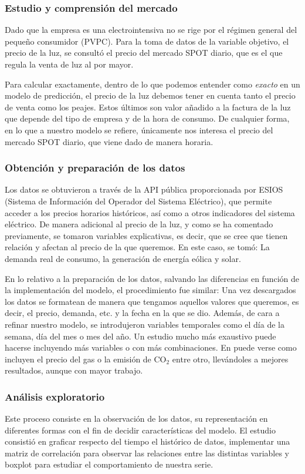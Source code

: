 \subsubsection{Estudio y comprensión del mercado}
%
%
%
Dado que la empresa es una electrointensiva no se rige por el régimen general del pequeño consumidor (PVPC). Para la toma de datos de la variable objetivo, el precio de la luz, se consultó el precio del mercado SPOT diario, que es el que regula la venta de luz al por mayor.

Para calcular exactamente, dentro de lo que podemos entender como \textit{exacto} en un modelo de predicción, el precio de la luz debemos tener en cuenta tanto el precio de venta como los peajes. Estos últimos son valor añadido a la factura de la luz que depende del tipo de empresa y de la hora de consumo. De cualquier forma, en lo que a nuestro modelo se refiere, únicamente nos interesa el precio del mercado SPOT diario, que viene dado de manera horaria.
%
%
%
\subsubsection{Obtención y preparación de los datos}
%
%
%
Los datos se obtuvieron a través de la API pública proporcionada por ESIOS (Sistema de Información del Operador del Sistema Eléctrico), que permite acceder a los precios horarios históricos, así como a otros indicadores del sistema eléctrico. De manera adicional al precio de la luz, y como se ha comentado previamente, se tomaron variables explicativas, es decir, que se cree que tienen relación y afectan al precio de la que queremos. En este caso, se tomó: La demanda real de consumo, la generación de energía eólica y solar.

En lo relativo a la preparación de los datos, salvando las diferencias en función de la implementación del modelo, el procedimiento fue similar: Una vez descargados los datos se formatean de manera que tengamos aquellos valores que queremos, es decir, el precio, demanda, etc. y la fecha en la que se dio. Además, de cara a refinar nuestro modelo, se introdujeron variables temporales como el día de la semana, día del mes o mes del año. Un estudio mucho más exaustivo puede hacerse incluyendo más variables o con más combinaciones. En \cite{TFG_prediccion} puede verse como incluyen el precio del gas o la emisión de CO$_2$ entre otro, llevándoles a mejores resultados, aunque con mayor trabajo.
%
%
%
\subsubsection{Análisis exploratorio}
%
%
%
Este proceso consiste en la observación de los datos, su representación en diferentes formas con el fin de decidir características del modelo. El estudio consistió en graficar respecto del tiempo el histórico de datos, implementar una matriz de correlación para observar las relaciones entre las distintas variables y boxplot para estudiar el comportamiento de nuestra serie.

